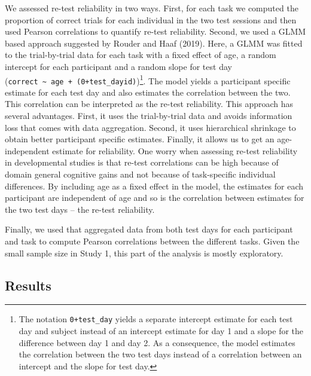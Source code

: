 \documentclass[
  english,
  man,floatsintext]{apa6}
\begin{document}
We assessed re-test reliability in two ways. First, for each task we computed the proportion of correct trials for each individual in the two test sessions and then used Pearson correlations to quantify re-test reliability. Second, we used a GLMM based approach suggested by Rouder and Haaf (2019). Here, a GLMM was fitted to the trial-by-trial data for each task with a fixed effect of age, a random intercept for each participant and a random slope for test day (\texttt{correct\ \textasciitilde{}\ age\ +\ (0+test\_day\textbar{}id)})\footnote{The notation \texttt{0+test\_day} yields a separate intercept estimate for each test day and subject instead of an intercept estimate for day 1 and a slope for the difference between day 1 and day 2. As a consequence, the model estimates the correlation between the two test days instead of a correlation between an intercept and the slope for test day.}. The model yields a participant specific estimate for each test day and also estimates the correlation between the two. This correlation can be interpreted as the re-test reliability. This approach has several advantages. First, it uses the trial-by-trial data and avoids information loss that comes with data aggregation. Second, it uses hierarchical shrinkage to obtain better participant specific estimates. Finally, it allows us to get an age-independent estimate for reliability. One worry when assessing re-test reliability in developmental studies is that re-test correlations can be high because of domain general cognitive gains and not because of task-specific individual differences. By including age as a fixed effect in the model, the estimates for each participant are independent of age and so is the correlation between estimates for the two test days -- the re-test reliability.

Finally, we used that aggregated data from both test days for each participant and task to compute Pearson correlations between the different tasks. Given the small sample size in Study 1, this part of the analysis is mostly exploratory.

\hypertarget{results}{%
\subsection{Results}\label{results}}
\end{document}
